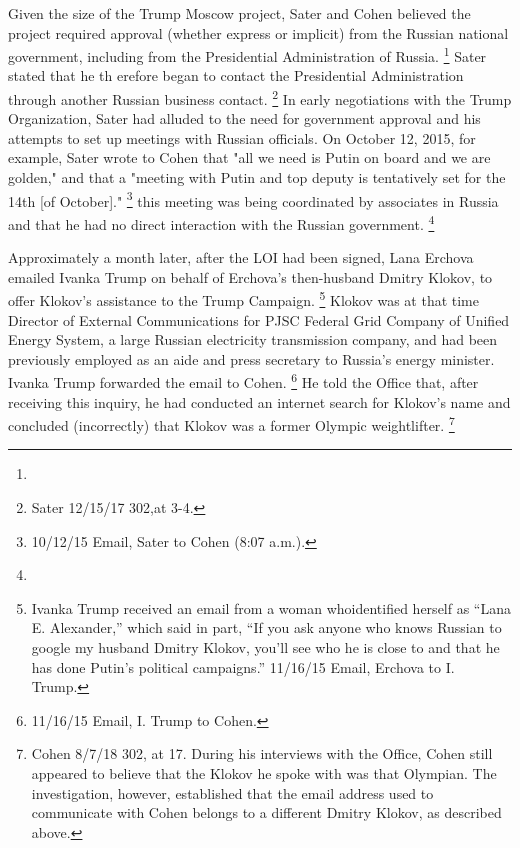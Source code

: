 Given the size of the Trump Moscow project, Sater and Cohen believed the project required approval (whether express or implicit) from the Russian national government, including from the Presidential Administration of Russia.%
\footnote{}
Sater stated that he th erefore began to contact the Presidential Administration through another Russian business contact.%
\footnote{Sater 12/15/17 302,at 3-4.}
In early negotiations with the Trump Organization, Sater had alluded to the need for government approval and his attempts to set up meetings with Russian officials.
On October 12, 2015, for example, Sater wrote to Cohen that "all we need is Putin on board and we are golden," and that a "meeting with Putin and top deputy is tentatively set for the 14th [of October]."%
\footnote{10/12/15 Email, Sater to Cohen (8:07 a.m.).}
 this meeting was being coordinated by associates in Russia and that he had no direct interaction with the Russian government.%
\footnote{}

Approximately a month later, after the LOI had been signed, Lana Erchova emailed Ivanka Trump on behalf of Erchova's then-husband Dmitry Klokov, to offer Klokov's assistance to the Trump Campaign.%
\footnote{Ivanka Trump received an email from a woman whoidentified herself as “Lana E. Alexander,” which said in part, “If you ask anyone who knows Russian to google my husband Dmitry Klokov, you’ll see who he is close to and that he has done Putin’s political campaigns.”
11/16/15 Email, Erchova to I. Trump.}
Klokov was at that time Director of External Communications for PJSC Federal Grid Company of Unified Energy System, a large Russian electricity transmission company, and had been previously employed as an aide and press secretary to Russia's energy minister.
Ivanka Trump forwarded the email to Cohen.%
\footnote{11/16/15 Email, I. Trump to Cohen.}
He told the Office that, after receiving this inquiry, he had conducted an internet search for Klokov's name and concluded (incorrectly) that Klokov was a former Olympic weightlifter.%
\footnote{Cohen 8/7/18 302, at 17.
During his interviews with the Office, Cohen still appeared to believe that the Klokov he spoke with was that Olympian.
The investigation, however, established that the email address used to communicate with Cohen belongs to a different Dmitry Klokov, as described above.}

